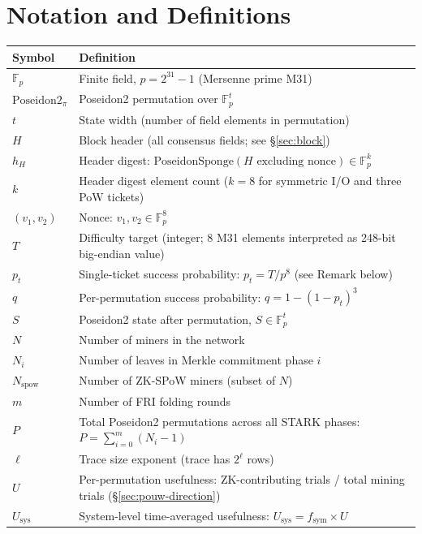 \documentclass[11pt,a4paper]{article}
\begin{document}
\section{Notation and Definitions}
\label{sec:notation}

\begin{table}[h]
\centering
\small
\begin{tabular}{@{}ll@{}}
\toprule
Symbol & Definition \\
\midrule
$\mathbb{F}_p$ & Finite field, $p = 2^{31}-1$ (Mersenne prime M31) \\
$\mathrm{Poseidon2}_\pi$ & Poseidon2 permutation over $\mathbb{F}_p^t$ \\
$t$ & State width (number of field elements in permutation) \\
$H$ & Block header (all consensus fields; see \S\ref{sec:block}) \\
$h_H$ & Header digest: $\mathrm{PoseidonSponge}(H \text{ excluding nonce}) \in \mathbb{F}_p^k$ \\
$k$ & Header digest element count ($k = 8$ for symmetric I/O and three PoW tickets) \\
$(v_1, v_2)$ & Nonce: $v_1, v_2 \in \mathbb{F}_p^8$ \\
$T$ & Difficulty target (integer; 8 M31 elements interpreted as 248-bit big-endian value) \\
$p_t$ & Single-ticket success probability: $p_t = T/p^8$ (see Remark below) \\
$q$ & Per-permutation success probability: $q = 1 - (1-p_t)^3$ \\
$S$ & Poseidon2 state after permutation, $S \in \mathbb{F}_p^t$ \\
$N$ & Number of miners in the network \\
$N_i$ & Number of leaves in Merkle commitment phase $i$ \\
$N_{\mathrm{spow}}$ & Number of ZK-SPoW miners (subset of $N$) \\
$m$ & Number of FRI folding rounds \\
$P$ & Total Poseidon2 permutations across all STARK phases: $P = \sum_{i=0}^{m}(N_i - 1)$ \\
$\ell$ & Trace size exponent (trace has $2^\ell$ rows) \\
$U$ & Per-permutation usefulness: ZK-contributing trials / total mining trials (\S\ref{sec:pouw-direction}) \\
$U_{\mathrm{sys}}$ & System-level time-averaged usefulness: $U_{\mathrm{sys}} = f_{\mathrm{sym}} \times U$ \\

\end{tabular}
\end{table}
\end{document}

